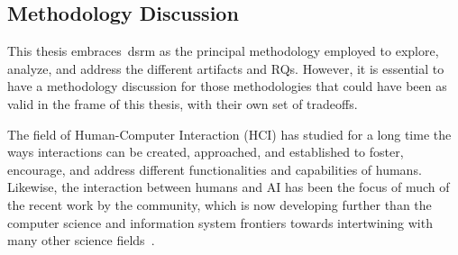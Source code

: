 

\subsection{Methodology Discussion}

This thesis embraces~\acrshort{dsrm} as the principal methodology employed to explore, analyze, and address the different artifacts and RQs. However, it is essential to have a methodology discussion for those methodologies that could have been as valid in the frame of this thesis, with their own set of tradeoffs. 


The field of Human-Computer Interaction (HCI) has studied for a long time the ways interactions can be created, approached, and established to foster, encourage, and address different functionalities and capabilities of humans. Likewise, the interaction between humans and AI has been the focus of much of the recent work by the community, which is now developing further than the computer science and information system frontiers towards intertwining with many other science fields~\cite{rahwan_machine_2019}. 

